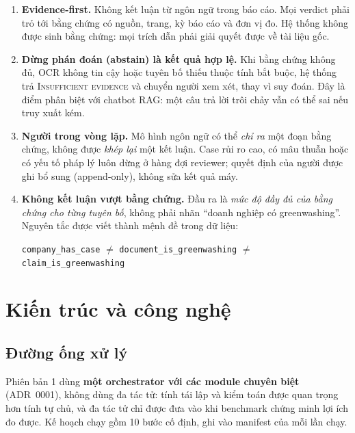 \documentclass[11pt,a4paper]{article}
\newcommand{\code}[1]{\texttt{#1}}
\newcommand{\status}[1]{\textsc{#1}}
\newcommand{\principle}[1]{\textcolor{gsgreen}{\textbf{#1}}}
\begin{document}
\begin{enumerate}[label=\textbf{P\arabic*.}]
  \item \principle{Evidence-first.} Không kết luận từ ngôn ngữ trong báo cáo. Mọi verdict phải trỏ tới bằng chứng có nguồn, trang, kỳ báo cáo và đơn vị đo. Hệ thống không được sinh bằng chứng: mọi trích dẫn phải giải quyết được về tài liệu gốc.
  \item \principle{Dừng phán đoán (abstain) là kết quả hợp lệ.} Khi bằng chứng không đủ, OCR không tin cậy hoặc tuyên bố thiếu thuộc tính bắt buộc, hệ thống trả \status{Insufficient evidence} và chuyển người xem xét, thay vì suy đoán. Đây là điểm phân biệt với chatbot RAG: một câu trả lời trôi chảy vẫn có thể sai nếu truy xuất kém.
  \item \principle{Người trong vòng lặp.} Mô hình ngôn ngữ có thể \emph{chỉ ra} một đoạn bằng chứng, không được \emph{khép lại} một kết luận. Case rủi ro cao, có mâu thuẫn hoặc có yếu tố pháp lý luôn dừng ở hàng đợi reviewer; quyết định của người được ghi bổ sung (append-only), không sửa kết quả máy.
  \item \principle{Không kết luận vượt bằng chứng.} Đầu ra là \emph{mức độ đầy đủ của bằng chứng cho từng tuyên bố}, không phải nhãn ``doanh nghiệp có greenwashing''. Nguyên tắc được viết thành mệnh đề trong dữ liệu:
  \begin{center}\small\code{company\_has\_case} $\neq$ \code{document\_is\_greenwashing} $\neq$ \code{claim\_is\_greenwashing}\end{center}
\end{enumerate}

\section{Kiến trúc và công nghệ}

\subsection{Đường ống xử lý}

Phiên bản 1 dùng \textbf{một orchestrator với các module chuyên biệt} (ADR~0001), không dùng đa tác tử: tính tái lập và kiểm toán được quan trọng hơn tính tự chủ, và đa tác tử chỉ được đưa vào khi benchmark chứng minh lợi ích đo được. Kế hoạch chạy gồm 10 bước cố định, ghi vào manifest của mỗi lần chạy.
\end{document}

